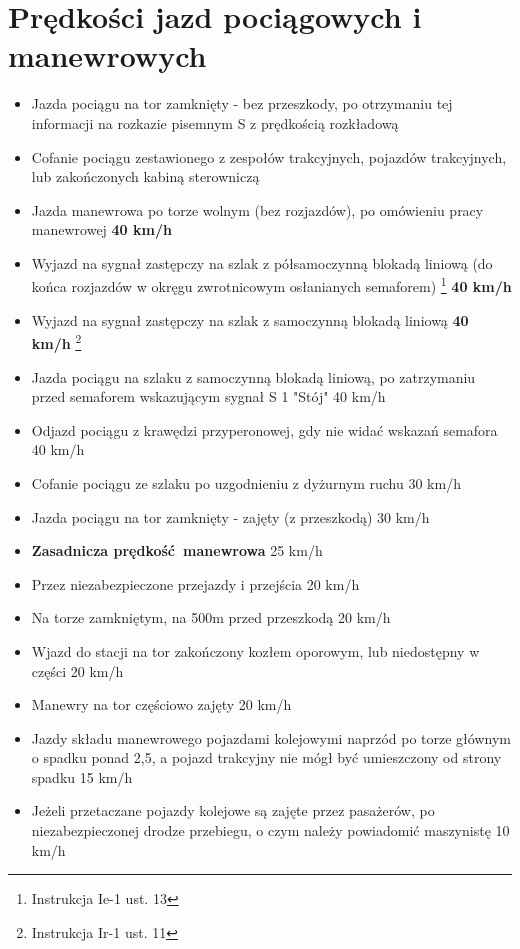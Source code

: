 \chapter{Prędkości jazd pociągowych i manewrowych}
\begin{itemize}
	\item Jazda pociągu na tor zamknięty - bez przeszkody, po otrzymaniu tej informacji na rozkazie pisemnym S z prędkością rozkładową
	\item Cofanie pociągu zestawionego z zespołów trakcyjnych, pojazdów trakcyjnych, lub zakończonych kabiną sterowniczą 
	\item Jazda manewrowa po torze wolnym (bez rozjazdów), po omówieniu pracy manewrowej
	\textbf{40 km/h}
	\item Wyjazd na sygnał zastępczy na szlak z półsamoczynną blokadą liniową (do końca rozjazdów
	w okręgu zwrotnicowym osłanianych semaforem) \footnote{Instrukcja Ie-1  ust. 13}
	\textbf{40 km/h}
	\item Wyjazd na sygnał zastępczy na szlak z samoczynną blokadą liniową
	\textbf{40 km/h} \footnote{Instrukcja Ir-1  ust. 11}
	\item Jazda pociągu na szlaku z samoczynną blokadą liniową, po zatrzymaniu przed semaforem wskazującym sygnał S 1 "Stój" 40 km/h 
	\item Odjazd pociągu z krawędzi przyperonowej, gdy nie widać wskazań semafora 
	40 km/h
	\item Cofanie pociągu ze szlaku po uzgodnieniu z dyżurnym ruchu 
	30 km/h
	\item Jazda pociągu na tor zamknięty - zajęty (z przeszkodą) 
	30 km/h
	\item \textbf{Zasadnicza prędkość~manewrowa} 
	25 km/h
	\item Przez niezabezpieczone przejazdy i przejścia 
	20 km/h
	\item Na torze zamkniętym, na 500m przed przeszkodą 
	20 km/h
	\item Wjazd do stacji na tor zakończony kozłem oporowym, lub niedostępny w części 
	20 km/h
	\item Manewry na tor częściowo zajęty 
	20 km/h
	\item Jazdy składu manewrowego pojazdami kolejowymi naprzód po torze głównym o spadku ponad 2,5\textperthousand, a pojazd trakcyjny nie mógł być umieszczony od strony spadku 
	15 km/h
	\item Jeżeli przetaczane pojazdy kolejowe są zajęte przez pasażerów, po niezabezpieczonej drodze przebiegu, o czym należy powiadomić maszynistę 10 km/h 

\end{itemize}

